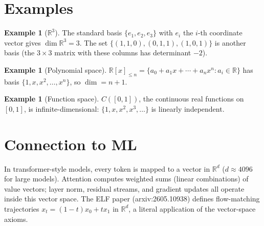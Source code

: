 \documentclass[11pt]{article}
\theoremstyle{definition}
\newtheorem{example}[theorem]{Example}
\begin{document}
\section{Examples}

\begin{example}[$\mathbb{R}^3$]
The standard basis $\{e_1, e_2, e_3\}$ with $e_i$ the $i$-th coordinate vector gives $\dim \mathbb{R}^3 = 3$. The set $\{(1,1,0), (0,1,1), (1,0,1)\}$ is another basis (the $3 \times 3$ matrix with these columns has determinant $-2$).
\end{example}

\begin{example}[Polynomial space]
$\mathbb{R}[x]_{\le n} = \{a_0 + a_1 x + \cdots + a_n x^n : a_i \in \mathbb{R}\}$ has basis $\{1, x, x^2, \dots, x^n\}$, so $\dim = n+1$.
\end{example}

\begin{example}[Function space]
$C([0,1])$, the continuous real functions on $[0,1]$, is infinite-dimensional: $\{1, x, x^2, x^3, \dots\}$ is linearly independent.
\end{example}

\section{Connection to ML}

In transformer-style models, every token is mapped to a vector in $\mathbb{R}^d$ ($d \approx 4096$ for large models). Attention computes weighted sums (linear combinations) of value vectors; layer norm, residual streams, and gradient updates all operate inside this vector space. The ELF paper (arxiv:2605.10938) defines flow-matching trajectories $x_t = (1-t)x_0 + t x_1$ in $\mathbb{R}^d$, a literal application of the vector-space axioms.
\end{document}
